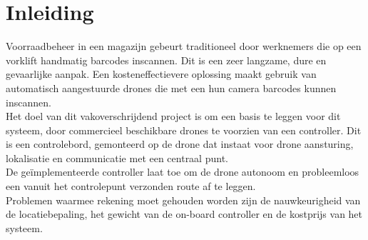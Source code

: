 \chapter*{Inleiding}
Voorraadbeheer in een magazijn gebeurt traditioneel door werknemers die op een vorklift handmatig barcodes inscannen.
Dit is een zeer langzame, dure en gevaarlijke aanpak.
Een kosteneffectievere oplossing maakt gebruik van automatisch aangestuurde drones die met een hun camera barcodes kunnen inscannen.\\

Het doel van dit vakoverschrijdend project is om een basis te leggen voor dit systeem, door commercieel beschikbare drones te voorzien van een controller.
Dit is een controlebord, gemonteerd op de drone dat instaat voor drone aansturing, lokalisatie en communicatie met een centraal punt.\\
De ge\"implementeerde controller laat toe om de drone autonoom en probleemloos een vanuit het controlepunt verzonden route af te leggen.\\

Problemen waarmee rekening moet gehouden worden zijn de nauwkeurigheid van de locatiebepaling, het gewicht van de on-board controller en de kostprijs van het systeem.